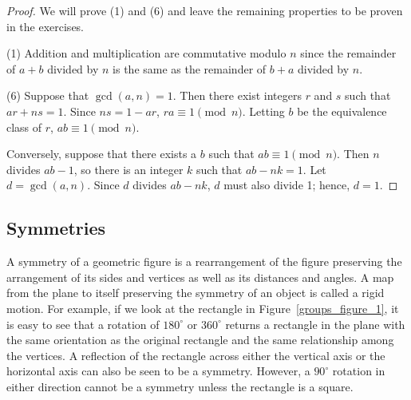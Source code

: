 \begin{proof}
We will prove (1) and (6) and leave the remaining properties to be proven in the exercises. 

(1)
Addition and multiplication are commutative modulo $n$ since the remainder of $a + b$ divided by $n$ is the same as the remainder of $b + a$ divided by $n$. 
 
(6)
Suppose that $\gcd(a, n) = 1$.  Then there exist integers $r$ and $s$ such that $ar + ns = 1$.  Since $ns = 1 - ar$, $ra  \equiv 1 \pmod{n}$.  Letting $b$ be the equivalence class of $r$, $a b \equiv 1\pmod{n}$. 
 
Conversely, suppose that there exists a $b$ such that $ab  \equiv 1 \pmod{ n}$.  Then $n$ divides $ab -1$, so there is an integer $k$ such that $ab - nk = 1$.  Let $d = \gcd(a,n)$.  Since $d$ divides $ab - nk$, $d$ must also divide 1; hence, $d = 1$.
\mbox{\hspace*{1in}}
\end{proof}
 
 
\subsection*{Symmetries}

A {\bfi symmetry} of a geometric figure is a rearrangement of the figure preserving the arrangement of its sides and vertices as well as its distances and angles.  A map from the plane to itself preserving the symmetry of an object is called a {\bfi rigid motion}.  For example, if we look at the rectangle in Figure~\ref{groups_figure_1}, it is easy to see that a rotation of $180^{\circ}$ or $360^{\circ}$ returns a rectangle in the plane with the same orientation as the original rectangle and the same relationship among the vertices.  A reflection of the rectangle across either the vertical axis or the horizontal axis can also be seen to be a symmetry.  However, a $90^{\circ}$ rotation in either direction cannot be a symmetry unless the rectangle is a square.


